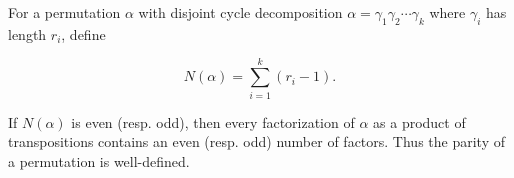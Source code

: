 For a permutation $\alpha$ with disjoint cycle decomposition $\alpha = \gamma_1 \gamma_2 \cdots \gamma_k$ where $\gamma_i$ has length $r_i$, define

$$N(\alpha) = \sum_{i=1}^k (r_i - 1).$$

If $N(\alpha)$ is even (resp. odd), then every factorization of $\alpha$ as a product of transpositions contains an even (resp. odd) number of factors. Thus the parity of a permutation is well-defined.
